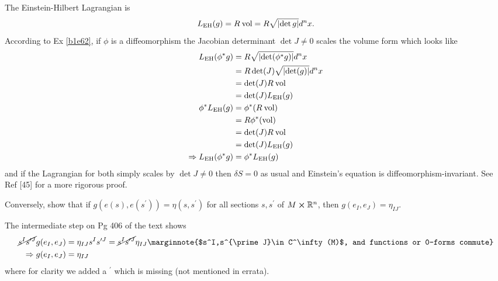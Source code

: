 \documentclass[10pt]{article}
\begin{document}
The Einstein-Hilbert Lagrangian is
$$
L_{\rm EH}(g) = R\:\text{vol} = R\sqrt{\abs{\det g}}d^nx.
$$
According to Ex \ref{b1e62}, if $\phi$ is a diffeomorphism the Jacobian determinant $\det J \ne 0$ scales the volume form which looks like
$$
\begin{aligned}
	L_{\rm EH}(\phi^*g) &= R\sqrt{\abs{\det(\phi^*g)}}d^nx\\
	&= R\det(J)\sqrt{\abs{\det(g)}}d^nx\\
	&= \det(J)R\:\text{vol}\\
	&= \det(J)L_{\rm EH}(g)\\
	\phi^*L_{\rm EH}(g) &= \phi^*(R\:\text{vol})\\
	&= R\phi^*(\text{vol})\\
	&= \det(J)R\:\text{vol}\\
	&= \det(J)L_{\rm EH}(g)\\
	\Rightarrow L_{\rm EH}(\phi^*g) &= \phi^*L_{\rm EH}(g)
\end{aligned}
$$
and if the Lagrangian for both simply scales by $\det J \ne 0$ then $\delta S = 0$ as usual and Einstein's equation is diffeomorphism-invariant. See Ref [45] for a more rigorous proof.


\begin{example}\label{b3e31}
	Conversely, show that if $g(e(s),e(s^\prime))=\eta(s,s^\prime)$ for all sections $s,s^\prime$ of $M\cross \mathbb{R}^n$, then $g(e_I,e_J)=\eta_{IJ}$.
\end{example}
\sol The intermediate step on Pg 406 of the text shows
$$
\begin{aligned}
	\cancel{s^Is^{\prime J}}g(e_I,e_J) &= \eta_{IJ}s^Is^{\prime J} = \cancel{s^Is^{\prime J}}\eta_{IJ}\marginnote{$s^I,s^{\prime J}\in C^\infty(M)$, and functions or 0-forms commute}\\
	\Rightarrow g(e_I,e_J) &= \eta_{IJ}
\end{aligned}
$$
where for clarity we added a $^\prime$ which is missing (not mentioned in errata).
\end{document}
